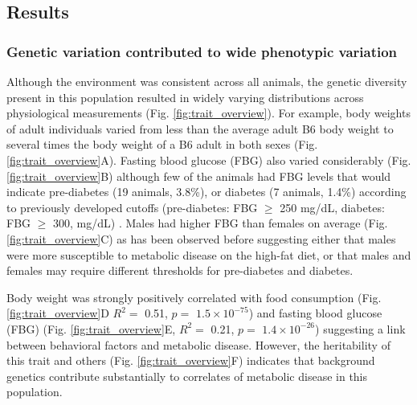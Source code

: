 \documentclass[
]{article}
\begin{document}
\subsection{Results}\label{results}

\subsubsection{Genetic variation contributed to wide phenotypic
variation}\label{genetic-variation-contributed-to-wide-phenotypic-variation}

Although the environment was consistent across all animals, the genetic
diversity present in this population resulted in widely varying
distributions across physiological measurements (Fig.
\ref{fig:trait_overview}). For example, body weights of adult
individuals varied from less than the average adult B6 body weight to
several times the body weight of a B6 adult in both sexes (Fig.
\ref{fig:trait_overview}A). Fasting blood glucose (FBG) also varied
considerably (Fig. \ref{fig:trait_overview}B) although few of the
animals had FBG levels that would indicate pre-diabetes (19 animals,
3.8\%), or diabetes (7 animals, 1.4\%) according to previously developed
cutoffs (pre-diabetes: FBG \(\geq\) 250 mg/dL, diabetes: FBG \(\geq\)
300, mg/dL) \cite{pmid17018838}. Males had higher FBG than females on
average (Fig. \ref{fig:trait_overview}C) as has been observed before
suggesting either that males were more susceptible to metabolic disease
on the high-fat diet, or that males and females may require different
thresholds for pre-diabetes and diabetes.

Body weight was strongly positively correlated with food consumption
(Fig. \ref{fig:trait_overview}D \(R^2 =\) 0.51, \(p=\)
\ensuremath{1.5\times 10^{-75}}) and fasting blood glucose (FBG) (Fig.
\ref{fig:trait_overview}E, \(R^2=\) 0.21, \(p =\)
\ensuremath{1.4\times 10^{-26}}) suggesting a link between behavioral
factors and metabolic disease. However, the heritability of this trait
and others (Fig. \ref{fig:trait_overview}F) indicates that background
genetics contribute substantially to correlates of metabolic disease in
this population.
\end{document}
